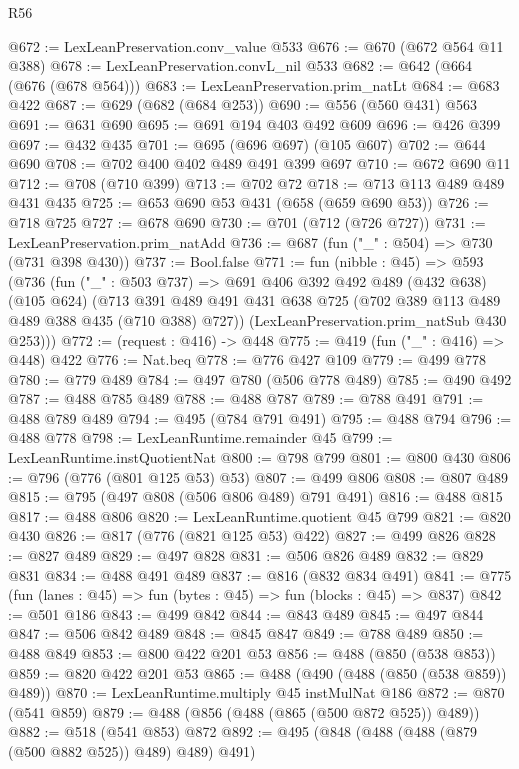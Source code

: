 \begin{lexlean}{R56}
\begin{coremodule}
@672 := LexLeanPreservation.conv_value @533
@676 := @670 (@672 @564 @11 @388)
@678 := LexLeanPreservation.convL_nil @533
@682 := @642 (@664 (@676 (@678 @564)))
@683 := LexLeanPreservation.prim_natLt
@684 := @683 @422
@687 := @629 (@682 (@684 @253))
@690 := @556 (@560 @431) @563
@691 := @631 @690
@695 := @691 @194 @403 @492 @609
@696 := @426 @399
@697 := @432 @435
@701 := @695 (@696 @697) (@105 @607)
@702 := @644 @690
@708 := @702 @400 @402 @489 @491 @399 @697
@710 := @672 @690 @11
@712 := @708 (@710 @399)
@713 := @702 @72
@718 := @713 @113 @489 @489 @431 @435
@725 := @653 @690 @53 @431 (@658 (@659 @690 @53))
@726 := @718 @725
@727 := @678 @690
@730 := @701 (@712 (@726 @727))
@731 := LexLeanPreservation.prim_natAdd
@736 := @687 (fun ("_" : @504) => @730 (@731 @398 @430))
@737 := Bool.false
@771 := fun (nibble : @45) =>
  @593
    (@736
      (fun ("_" : @503 @737) =>
      @691
        @406
        @392
        @492
        @489
        (@432 @638)
        (@105 @624)
        (@713 @391 @489 @491 @431 @638 @725 (@702 @389 @113 @489 @489 @388 @435 (@710 @388) @727))
        (LexLeanPreservation.prim_natSub @430 @253)))
@772 := (request : @416) -> @448
@775 := @419 (fun ("_" : @416) => @448) @422
@776 := Nat.beq
@778 := @776 @427 @109
@779 := @499 @778
@780 := @779 @489
@784 := @497 @780 (@506 @778 @489)
@785 := @490 @492
@787 := @488 @785 @489
@788 := @488 @787
@789 := @788 @491
@791 := @488 @789 @489
@794 := @495 (@784 @791 @491)
@795 := @488 @794
@796 := @488 @778
@798 := LexLeanRuntime.remainder @45
@799 := LexLeanRuntime.instQuotientNat
@800 := @798 @799
@801 := @800 @430
@806 := @796 (@776 (@801 @125 @53) @53)
@807 := @499 @806
@808 := @807 @489
@815 := @795 (@497 @808 (@506 @806 @489) @791 @491)
@816 := @488 @815
@817 := @488 @806
@820 := LexLeanRuntime.quotient @45 @799
@821 := @820 @430
@826 := @817 (@776 (@821 @125 @53) @422)
@827 := @499 @826
@828 := @827 @489
@829 := @497 @828
@831 := @506 @826 @489
@832 := @829 @831
@834 := @488 @491 @489
@837 := @816 (@832 @834 @491)
@841 := @775 (fun (lanes : @45) => fun (bytes : @45) => fun (blocks : @45) => @837)
@842 := @501 @186
@843 := @499 @842
@844 := @843 @489
@845 := @497 @844
@847 := @506 @842 @489
@848 := @845 @847
@849 := @788 @489
@850 := @488 @849
@853 := @800 @422 @201 @53
@856 := @488 (@850 (@538 @853))
@859 := @820 @422 @201 @53
@865 := @488 (@490 (@488 (@850 (@538 @859)) @489))
@870 := LexLeanRuntime.multiply @45 instMulNat @186
@872 := @870 (@541 @859)
@879 := @488 (@856 (@488 (@865 (@500 @872 @525)) @489))
@882 := @518 (@541 @853) @872
@892 := @495 (@848 (@488 (@488 (@879 (@500 @882 @525)) @489) @489) @491)

\end{coremodule}
\end{lexlean}
